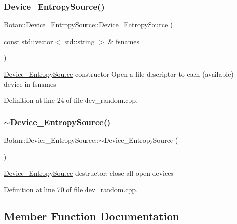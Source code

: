 \subsubsection{\texorpdfstring{Device\+\_\+\+Entropy\+Source()}{Device\_EntropySource()}}
{\footnotesize\ttfamily Botan\+::\+Device\+\_\+\+Entropy\+Source\+::\+Device\+\_\+\+Entropy\+Source (\begin{DoxyParamCaption}\item[{const std\+::vector$<$ std\+::string $>$ \&}]{fsnames }\end{DoxyParamCaption})\hspace{0.3cm}{\ttfamily [explicit]}}

\mbox{\hyperlink{class_botan_1_1_device___entropy_source}{Device\+\_\+\+Entropy\+Source}} constructor Open a file descriptor to each (available) device in fsnames 

Definition at line 24 of file dev\+\_\+random.\+cpp.

\mbox{\label{class_botan_1_1_device___entropy_source_aa5b299286c2498607c59842b2dfa054b}} 
\subsubsection{\texorpdfstring{$\sim$\+Device\+\_\+\+Entropy\+Source()}{~Device\_EntropySource()}}
{\footnotesize\ttfamily Botan\+::\+Device\+\_\+\+Entropy\+Source\+::$\sim$\+Device\+\_\+\+Entropy\+Source (\begin{DoxyParamCaption}{ }\end{DoxyParamCaption})}

\mbox{\hyperlink{class_botan_1_1_device___entropy_source}{Device\+\_\+\+Entropy\+Source}} destructor\+: close all open devices 

Definition at line 70 of file dev\+\_\+random.\+cpp.



\subsection{Member Function Documentation}
\mbox{\label{class_botan_1_1_device___entropy_source_aaff331d75f17088ff6ccbd24c07a436c}} 
